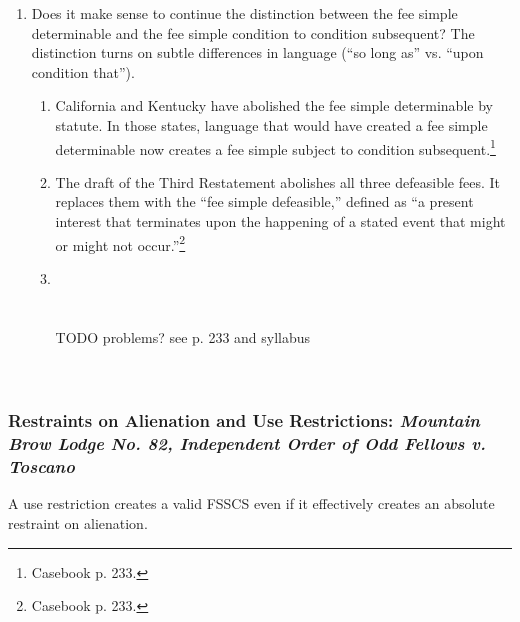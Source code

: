 \begin{enumerate}
    \item Does it make sense to continue the distinction between the fee 
    simple determinable and the fee simple condition to condition subsequent? 
    The distinction turns on subtle differences in language (``so long as'' 
    vs. ``upon condition that'').
    \begin{enumerate}
        \item California and Kentucky have abolished the fee simple 
        determinable by statute. In those states, language that would have 
        created a fee simple determinable now creates a fee simple subject to 
        condition subsequent.\footnote{Casebook p. 233.}
        \item The draft of the Third Restatement abolishes all three 
        defeasible fees. It replaces them with the ``fee simple defeasible,'' 
        defined as ``a present interest that terminates upon the happening of 
        a stated event that might or might not occur.''\footnote{Casebook p. 
        233.}
        \item ~\\\\\\TODO problems? see p. 233 and syllabus\\\\\\
    \end{enumerate}
\end{enumerate}

\subsubsection{Restraints on Alienation and Use Restrictions: \emph{Mountain 
Brow Lodge No. 82, Independent Order of Odd Fellows v. Toscano}}

A use restriction creates a valid FSSCS even if it effectively creates an 
absolute restraint on alienation.

